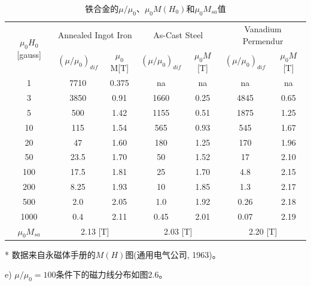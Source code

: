 \begin{table}[htbp]
\centering
\caption{铁合金的$\mu/\mu_0$、$\mu_0M(H_0)$和$\mu_0 M_{sa}$值}
\begin{threeparttable}
\begin{tabular}{|c|c|c|c|c|c|c|}
\hline
\multirow{2}{*}{$\mu_0 H_0$[gauss]} & \multicolumn{2}{c|}{Annealed Ingot Iron} & \multicolumn{2}{c|}{As-Cast Steel} & \multicolumn{2}{c|}{Vanadium Permendur} \\ \cline{2-7}
&$ (\mu/\mu_0)_{dif} $ \tnote{*}& $\mu_0 $M[T] & $(\mu/\mu_0)_{dif} $\tnote{*} &$ \mu_0 M$[T] &$ (\mu/\mu_0)_{dif} $\tnote{*} & $\mu_0 M$[T] \\ \hline
1 & 7710 & 0.375 & na & na & na & na \\ \hline
3 & 3850 & 0.91 & 1660 & 0.25 & 4845 & 0.65 \\ \hline
5 & 500 & 1.42 & 1155 & 0.51 & 1875 & 1.25 \\ \hline
10 & 115 & 1.54 & 565 & 0.93 & 545 & 1.67 \\ \hline
20 & 47 & 1.60 & 180 & 1.25 & 170 & 1.96 \\ \hline
50 & 23.5 & 1.70 & 50 & 1.52 & 17 & 2.10 \\ \hline
100 & 17.5 & 1.81 & 25 & 1.70 & 4.8 & 2.15 \\ \hline
200 & 8.25 & 1.93 & 10 & 1.85 & 1.3 & 2.17 \\ \hline
500 & 2.0 & 2.05 & 1.0 & 1.92 & 0.26 & 2.18 \\ \hline
1000 & 0.4 & 2.11 & 0.45 & 2.01 & 0.07 & 2.19 \\ \hline
$\mu_0 M_{sa} $ & \multicolumn{2}{c|}{2.13 [T]} & \multicolumn{2}{c|}{2.03 [T]} & \multicolumn{2}{c|}{2.20 [T]} \\ \hline
\end{tabular}
\begin{tablenotes}
        \footnotesize
        \item[*] 数据来自永磁体手册的$M(H)$图(通用电气公司, 1963)。 %
      \end{tablenotes}
\end{threeparttable}
\end{table}

e) $\mu/\mu_0=100$条件下的磁力线分布如图2.6。

